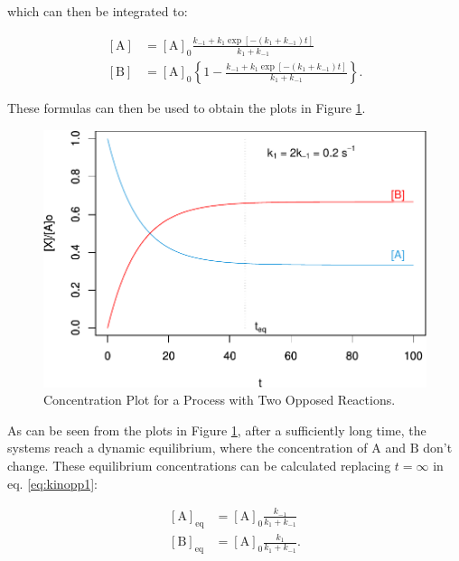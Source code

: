 \documentclass[
  9pt,
]{extbook}
\theoremstyle{definition}
\theoremstyle{definition}
\theoremstyle{definition}
\theoremstyle{remark}
\begin{document}
which can then be integrated to:

\begin{equation}
\begin{aligned}
\left[\mathrm{A}\right] &=[\mathrm{A}]_0\frac{k_{-1}+k_1\exp[-(k_1+k_{-1})t]}{k_1+k_{-1}} \\
\left[\mathrm{B}\right] &=[\mathrm{A}]_0\left\{ 1-\frac{k_{-1}+k_1\exp[-(k_1+k_{-1})t]}{k_1+k_{-1}}\right\}.
\end{aligned}
\label{eq:kinopp2}
\end{equation}

These formulas can then be used to obtain the plots in Figure \ref{fig:figkK}.

\begin{figure}

{\centering \includegraphics{pchem1_files/figure-latex/figkK-1} 

}

\caption{Concentration Plot for a Process with Two Opposed Reactions.}\label{fig:figkK}
\end{figure}

As can be seen from the plots in Figure \ref{fig:figkK}, after a sufficiently long time, the systems reach a dynamic equilibrium, where the concentration of \(\mathrm{A}\) and \(\mathrm{B}\) don't change. These equilibrium concentrations can be calculated replacing \(t=\infty\) in eq. \eqref{eq:kinopp1}:

\begin{equation}
\begin{aligned}
\left[\mathrm{A} \right] _{\mathrm{eq}} &= [\mathrm{A}]_0 \frac{k_{-1}}{k_1+k_{-1}} \\
[\mathrm{B}]_{\mathrm{eq}} &= [\mathrm{A}]_0 \frac{k_{1}}{k_1+k_{-1}}.
\end{aligned}
\label{eq:kinopp3}
\end{equation}
\end{document}
